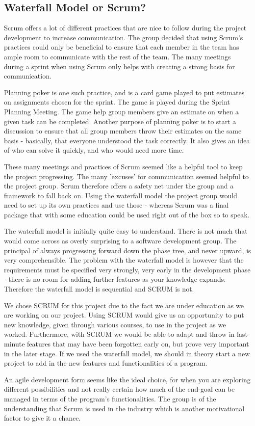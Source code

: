 \subsection{Waterfall Model or Scrum?}

Scrum offers a lot of different practices that are nice to follow during the project
development to increase communication. The group decided that using Scrum's practices could
only be beneficial to ensure that each member in the team has ample room to communicate with
the rest of the team. The many meetings during a sprint when using Scrum only helps with 
creating a strong basis for communication.


Planning poker is one such practice, and is a card game played to put estimates
on assignments chosen for the sprint. The game is played during the Sprint Planning Meeting.
The game help group members give an estimate on when a given task can be completed. Another
purpose of planning poker is to start a discussion to ensure that all group members throw
their estimates on the same basis - basically, that everyone understood the task correctly.
It also gives an idea of who can solve it quickly, and who would need more time.


These many meetings and practices of Scrum seemed like a helpful tool to keep the project
progressing. The many 'excuses' for communication seemed helpful to the project group. Scrum
therefore offers a safety net under the group and a framework to fall back on. Using the
waterfall model the project group would need to set up its own practices and use those -
whereas Scrum was a final package that with some education could be used right out of the
box so to speak. 


The waterfall model is initially quite easy to understand. There is not much that would come
across as overly surprising to a software development group. The principal of always
progressing forward down the phase tree, and never upward, is very comprehensible. The
problem with the waterfall model is however that the requirements must be specified very
strongly, very early in the development phase - there is no room for adding further features
as your knowledge expands. Therefore the waterfall model is sequential and SCRUM is
not\cite{waterfallexplained}. 


We chose SCRUM for this project due to the fact we are under education as we are working on
our project. Using SCRUM would give us an opportunity to put new knowledge, given through
various courses, to use in the project as we worked\cite{waterfallvsagile11}. Furthermore,
with SCRUM we would be able to adapt and throw in last-minute features that may have been
forgotten early on, but prove very important in the later stage. If we used the waterfall
model, we should in theory start a new project to add in the new features and
functionalities of a program\cite{waterfallexplained}. 


An agile development form seems like the ideal choice, for when you are exploring different
possibilities and not really certain how much of the end-goal can be managed in terms of the
program's functionalities\cite{waterfallvsagile11}.
The group is of the understanding that Scrum is used in the industry which is another
motivational factor to give it a chance.